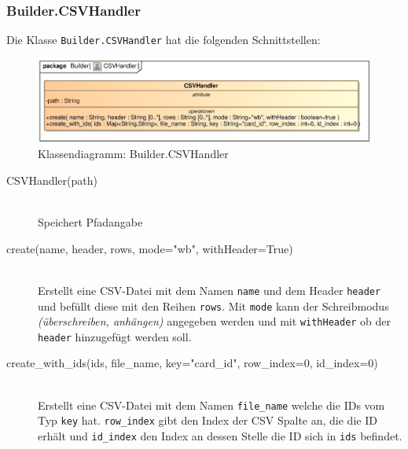 \subsubsection{Builder.CSVHandler}
Die Klasse \verb|Builder.CSVHandler| hat die folgenden Schnittstellen:
\begin{figure}[H]
    \myfloatalign
    \includegraphics[width=\textwidth]{gfx/MtGDeepAnalysis/CSVHandler.eps}
    \caption{Klassendiagramm: Builder.CSVHandler}
    \label{fig:class:builder.CSVHandler}
\end{figure}
\begin{description}
    \item[CSVHandler(path)] \hfill \\
    Speichert Pfadangabe
    
    \item[create(name, header, rows, mode="wb", withHeader=True)] \hfill \\
    Erstellt eine \ac{CSV}-Datei mit dem Namen \verb|name| und dem Header \verb|header| und befüllt diese mit den Reihen \verb|rows|. Mit \verb|mode| kann der Schreibmodus \emph{(überschreiben, anhängen)} angegeben werden und mit \verb|withHeader| ob der \verb|header| hinzugefügt werden soll.
    
    \item[create\_with\_ids(ids, file\_name, key="card\_id", row\_index=0, id\_index=0)] \hfill \\
    Erstellt eine \ac{CSV}-Datei mit dem Namen \verb|file_name| welche die IDs vom Typ \verb|key| hat. \verb|row_index| gibt den Index der CSV Spalte an, die die ID erhält und \verb|id_index| den Index an dessen Stelle die ID sich in \verb|ids| befindet.
\end{description}

